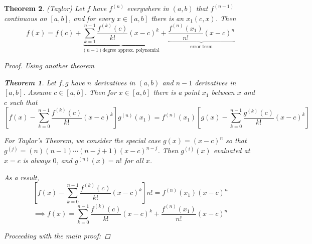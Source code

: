 \documentclass[12pt]{article}
\newtheorem{theorem}{Theorem}[section]
\theoremstyle{definition}
\theoremstyle{remark}
\begin{document}
\begin{theorem}
    (Taylor) Let $f$ have $f^{(n)}$ everywhere in $(a,b)$ that $f^{(n-1)}$ continuous on $[a,b]$, and for every $x\in[a,b]$ there is an $x_1(c,x)$. Then
    \begin{equation}\label{taylors}
        f(x)=f(c)+\underbrace{\sum_{k=1}^{n-1}\frac{f^{(k)}(c)}{k!}(x-c)^k}_{(n-1) \text{degree approx. polynomial}}+\underbrace{\frac{f^{(n)}(x_1)}{n!}(x-c)^n}_{\text{error term}}
    \end{equation}
    \begin{proof}
        Using another theorem \begin{theorem}
            Let $f,g$ have $n$ derivatives in $(a,b)$ and $n-1$ derivatives in $[a,b]$. Assume $c\in[a,b]$. Then for $x\in[a,b]$ there is a point $x_1$ between $x$ and $c$ such that
            \[
            \left[f(x)-\sum^{n-1}_{k=0}\frac{f^{(k)}(c)}{k!}(x-c)^k\right]g^{(n)}(x_1)=f^{(n)}(x_1)\left[g(x)-\sum^{n-1}_{k=0}\frac{g^{(k)}(c)}{k!}(x-c)^k\right]
            \]
        \end{theorem}
        For Taylor's Theorem, we consider the special case $g(x)=(x-c)^n$ so that $g^{(j)}=(n)(n-1)\cdots(n-j+1)(x-c)^{n-j}$. Then $g^{(i)}(x)$ evaluated at $x=c$ is always $0$, and $g^{(n)}(x)=n!$ for all $x$.

        As a result,
        \[
            \left[f(x)-\sum^{n-1}_{k=0}\frac{f^{(k)}(c)}{k!}(x-c)^k\right]n! =f^{(n)}(x_1)(x-c)^n
        \]
        \[
            \implies f(x)=\sum^{n-1}_{k=0}\frac{f^{(k)}(c)}{k!}(x-c)^k+\frac{f^{(n)}(x_1)}{n!}(x-c)^n
        \]

        Proceeding with the main proof:


\end{proof}
\end{theorem}
\end{document}
